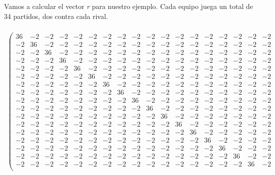 \begin{ejem} Vamos a calcular el vector \textit{r} para nuestro ejemplo. Cada equipo juega un total de 34 partidos, dos contra cada rival.\\
	\\
	{\tiny \[
		\begin{array}{ccccccccccccccccccccc} 
		\left(\begin{array}{cccccccccccccccccc}
		36 & -2 & -2 & -2 & -2 & -2 & -2 & -2 & -2 & -2 & -2 & -2 & -2 & -2 & -2 & -2 & -2 & -2\\
		-2 & 36 & -2 & -2 & -2 & -2 & -2 & -2 & -2 & -2 & -2 & -2 & -2 & -2 & -2 & -2 & -2 & -2\\
		-2 & -2 & 36 & -2 & -2 & -2 & -2 & -2 & -2 & -2 & -2 & -2 & -2 & -2 & -2 & -2 & -2 & -2\\
		-2 & -2 & -2 & 36 & -2 & -2 & -2 & -2 & -2 & -2 & -2 & -2 & -2 & -2 & -2 & -2 & -2 & -2\\
		-2 & -2 & -2 & -2 & 36 & -2 & -2 & -2 & -2 & -2 & -2 & -2 & -2 & -2 & -2 & -2 & -2 & -2\\
		-2 & -2 & -2 & -2 & -2 & 36 & -2 & -2 & -2 & -2 & -2 & -2 & -2 & -2 & -2 & -2 & -2 & -2\\
		-2 & -2 & -2 & -2 & -2 & -2 & 36 & -2 & -2 & -2 & -2 & -2 & -2 & -2 & -2 & -2 & -2 & -2\\
		-2 & -2 & -2 & -2 & -2 & -2 & -2 & 36 & -2 & -2 & -2 & -2 & -2 & -2 & -2 & -2 & -2 & -2\\
		-2 & -2 & -2 & -2 & -2 & -2 & -2 & -2 & 36 & -2 & -2 & -2 & -2 & -2 & -2 & -2 & -2 & -2\\
		-2 & -2 & -2 & -2 & -2 & -2 & -2 & -2 & -2 & 36 & -2 & -2 & -2 & -2 & -2 & -2 & -2 & -2\\
		-2 & -2 & -2 & -2 & -2 & -2 & -2 & -2 & -2 & -2 & 36 & -2 & -2 & -2 & -2 & -2 & -2 & -2\\
		-2 & -2 & -2 & -2 & -2 & -2 & -2 & -2 & -2 & -2 & -2 & 36 & -2 & -2 & -2 & -2 & -2 & -2\\
		-2 & -2 & -2 & -2 & -2 & -2 & -2 & -2 & -2 & -2 & -2 & -2 & 36 & -2 & -2 & -2 & -2 & -2\\
		-2 & -2 & -2 & -2 & -2 & -2 & -2 & -2 & -2 & -2 & -2 & -2 & -2 & 36 & -2 & -2 & -2 & -2\\
		-2 & -2 & -2 & -2 & -2 & -2 & -2 & -2 & -2 & -2 & -2 & -2 & -2 & -2 & 36 & -2 & -2 & -2\\
		-2 & -2 & -2 & -2 & -2 & -2 & -2 & -2 & -2 & -2 & -2 & -2 & -2 & -2 & -2 & 36 & -2 & -2\\ 
		-2 & -2 & -2 & -2 & -2 & -2 & -2 & -2 & -2 & -2 & -2 & -2 & -2 & -2 & -2 & -2 & 36 & -2\\ 

\end{array}
\end{array}\]}
\end{ejem}

